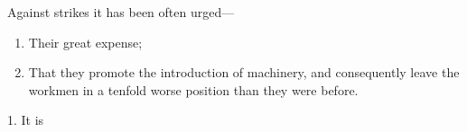 Against strikes it has been often urged---

\begin{enumerate}
    \item Their great expense;
    \item That they promote the introduction of machinery, and
    consequently leave the workmen in a tenfold worse position than they
    were before.
\end{enumerate}

1. It is
